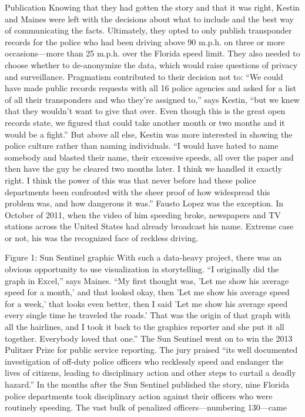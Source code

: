 Publication
Knowing that they had gotten the story and that it was right, Kestin and
Maines were left with the decisions about what to include and the best way
of communicating the facts. Ultimately, they opted to only publish transponder
records for the police who had been driving above 90 m.p.h. on
three or more occasions—more than 25 m.p.h. over the Florida speed limit.
They also needed to choose whether to de-anonymize the data, which would
raise questions of privacy and surveillance. Pragmatism contributed to their
decision not to: ``We could have made public records requests with all 16
police agencies and asked for a list of all their transponders and who they're
assigned to,'' says Kestin, ``but we knew that they wouldn't want to give that
over. Even though this is the great open records state, we figured that could
take another month or two months and it would be a fight.'' But above all
else, Kestin was more interested in showing the police culture rather than
naming individuals. ``I would have hated to name somebody and blasted
their name, their excessive speeds, all over the paper and then have the guy
be cleared two months later. I think we handled it exactly right. I think the
power of this was that never before had these police departments been confronted
with the sheer proof of how widespread this problem was, and how
dangerous it was.''
Fausto Lopez was the exception. In October of 2011, when the video of him
speeding broke, newspapers and TV stations across the United States had
already broadcast his name. Extreme case or not, his was the recognized
face of reckless driving.

Figure 1: Sun Sentinel graphic
With such a data-heavy project, there was an obvious opportunity to use
visualization in storytelling. ``I originally did the graph in Excel,'' says Maines.
``My first thought was, 'Let me show his average speed for a month,' and that
looked okay, then 'Let me show his average speed for a week,' that looks
even better, then I said 'Let me show his average speed every single time he
traveled the roads.' That was the origin of that graph with all the hairlines,
and I took it back to the graphics reporter and she put it all together. Everybody
loved that one.''
The Sun Sentinel went on to win the 2013 Pulitzer Prize for public service
reporting. The jury praised ``its well documented investigation of off-duty
police officers who recklessly speed and endanger the lives of citizens, leading
to disciplinary action and other steps to curtail a deadly hazard.'' In
the months after the Sun Sentinel published the story, nine Florida police
departments took disciplinary action against their officers who were routinely
speeding. The vast bulk of penalized officers—numbering 130—came

